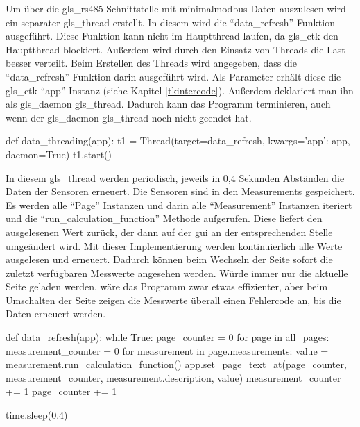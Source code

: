 \label{auslesen_rlt_parameter}

Um über die \gls{gls_rs485} Schnittstelle mit minimalmodbus Daten auszulesen wird ein separater \gls{gls_thread} erstellt. In diesem wird die \enquote{data\_refresh} Funktion ausgeführt. Diese Funktion kann nicht im Hauptthread laufen, da \gls{gls_ctk} den Hauptthread blockiert. Außerdem wird durch den Einsatz von Threads die Last besser verteilt. Beim Erstellen des Threads wird angegeben, dass die \enquote{data\_refresh} Funktion darin ausgeführt wird. Als Parameter erhält diese die \gls{gls_ctk} \enquote{app} Instanz (siehe Kapitel  \ref{tkintercode}). Außerdem deklariert man ihn als \gls{gls_daemon} \gls{gls_thread}. Dadurch kann das Programm terminieren, auch wenn der \gls{gls_daemon} \gls{gls_thread} noch nicht geendet hat.

\begin{pythoncode}
def data_threading(app):
	t1 = Thread(target=data_refresh, kwargs={'app': app}, daemon=True)
	t1.start()
\end{pythoncode}

In diesem \gls{gls_thread} werden periodisch, jeweils in 0,4 Sekunden Abständen die Daten der Sensoren erneuert. Die Sensoren sind in den Measurements gespeichert. Es werden alle \enquote{Page} Instanzen und darin alle \enquote{Measurement} Instanzen iteriert und die \enquote{run\_calculation\_function} Methode aufgerufen. Diese liefert den ausgelesenen Wert zurück, der dann auf der \acs{gui} an der entsprechenden Stelle umgeändert wird. \newline Mit dieser Implementierung werden kontinuierlich alle Werte ausgelesen und erneuert. Dadurch können beim Wechseln der Seite sofort die zuletzt verfügbaren Messwerte angesehen werden. Würde immer nur die aktuelle Seite geladen werden, wäre das Programm zwar etwas effizienter, aber beim Umschalten der Seite zeigen die Messwerte überall einen Fehlercode an, bis die Daten erneuert werden. 

\begin{pythoncode}
def data_refresh(app):
	while True:
		page_counter = 0
		for page in all_pages:
			measurement_counter = 0
			for measurement in page.measurements:
				value = measurement.run_calculation_function()
				app.set_page_text_at(page_counter, measurement_counter, measurement.description, value)
				measurement_counter += 1
			page_counter += 1
		
		time.sleep(0.4)
\end{pythoncode}

